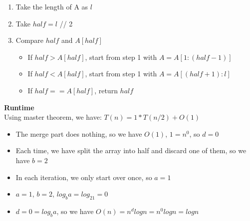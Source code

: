 \documentclass{article}
\def\math#1{$#1$}
\begin{document}
\begin{enumerate}[Step 1]
    \item Take the length of A as \math{l}
    \item Take \math{half = l} // 2
    \item Compare \math{half} and \math{A[half]}
        \begin{itemize}
            \item If \math{half > A[half]}, start from step 1 with \math{A = A[1:(half - 1)]}
            \item If \math{half < A[half]}, start from step 1 with \math{A = A[(half + 1):l]}
            \item If \math{half == A[half]}, return \math{half}
        \end{itemize}
\end{enumerate}

\textbf{Runtime} \\

Using master theorem, we have: \math{T(n) = 1 * T(n/2) + O(1)}

\begin{itemize}
    \item The merge part does nothing, so we have \math{O(1)}, \math{1 = n^0}, so \math{d = 0}
    \item Each time, we have split the array into half and discard one of them, so we have \math{b = 2}
    \item In each iteration, we only start over once, so \math{a = 1}
\end{itemize}

\begin{itemize}
    \item \math{a = 1}, \math{b = 2}, \math{log_ba = log_21 = 0}
    \item \math{d = 0 = log_ba}, so we have \math{O(n) = n^dlogn = n^0logn = logn}
\end{itemize}
\end{document}
